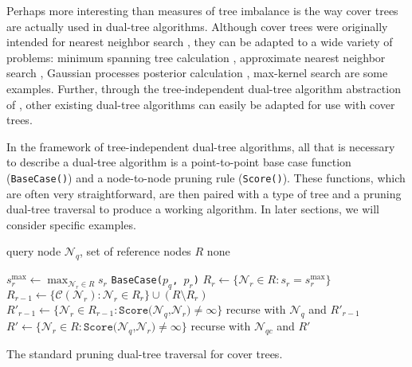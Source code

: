 Perhaps more interesting than measures of tree imbalance is the way cover trees
are actually used in dual-tree algorithms.  Although cover trees were originally
intended for nearest neighbor search \citep*[see Algorithm
\texttt{Find-All-Nearest},][]{langford2006}, they can be adapted to a wide
variety of problems: minimum
spanning tree calculation \citep{march2010euclidean}, approximate nearest neighbor
search \citep{ram2009rank}, Gaussian processes posterior calculation
\citep{moore2014fast}, max-kernel search \citep{curtin2014dual} are some
examples.  Further, through the tree-independent dual-tree algorithm abstraction
of \citet{curtin2013tree}, other existing dual-tree algorithms can easily be
adapted for use with cover trees.

In the framework of tree-independent dual-tree algorithms, all that is necessary
to describe a dual-tree algorithm is a point-to-point base case function
(\texttt{BaseCase()}) and a node-to-node pruning rule (\texttt{Score()}).  These
functions, which are often very straightforward, are then paired with a type of
tree and a pruning dual-tree traversal to produce a working algorithm.  In later
sections, we will consider specific examples.

\begin{algorithm}[tb]
  \begin{algorithmic}[1]
     query node $\mathscr{N}_q$, set of reference nodes
$R$ \label{alg:line:ct-dual-input}
     none

    \medskip
    \STATE $s^{\max}_r \gets \max_{\mathscr{N}_r \in R} s_r$
\label{alg:line:ct-dual-ref-recursion-start}
       \label{alg:line:ct-dual-base-case-start}
        \STATE \texttt{BaseCase($p_q$, $p_r$)}
      \ENDFOR \label{alg:line:ct-dual-base-case-end}
      \STATE $R_r \gets \{ \mathscr{N}_r \in R : s_r = s^{\max}_r \}$
\label{alg:line:ct-dual-ref-set}
      \STATE $R_{r - 1} \gets \{ \mathscr{C}(\mathscr{N}_r) : \mathscr{N}_r \in
R_r \} \cup (R \setminus R_r)$ \label{alg:line:ct-dual-ref-children}
      \STATE $R'_{r - 1} \gets \{ \mathscr{N}_r \in R_{r - 1} :
\texttt{Score(}\mathscr{N}_q\texttt{,} \mathscr{N}_r\texttt{)} \ne \infty \}$
\label{alg:line:ct-dual-ref-score}
      \STATE recurse with $\mathscr{N}_q$ and $R'_{r - 1}$
\label{alg:line:ct-dual-ref-recursion-end}
    \ELSE \label{alg:line:ct-dual-query-recursion-start}
        \STATE $R' \gets \{ \mathscr{N}_r \in R :
\texttt{Score(}\mathscr{N}_q\texttt{,} \mathscr{N}_r\texttt{)} \ne \infty \}$
\label{alg:line:ct-dual-query-pruning}
        \STATE recurse with $\mathscr{N}_{qc}$ and $R'$
\label{alg:line:ct-dual-query-recursion}
      \ENDFOR \label{alg:line:ct-dual-query-recursion-end}
    \ENDIF
  \end{algorithmic}
  \caption{The standard pruning dual-tree traversal for cover trees.}
  \label{alg:cover-tree-dual}
\end{algorithm}

